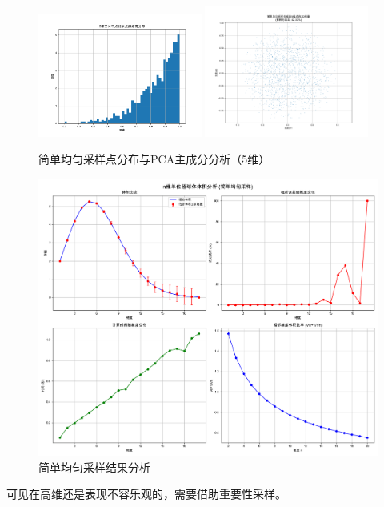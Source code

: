 \begin{figure}[H]
    \centering
    \includegraphics[width=0.48\textwidth]{Problem_1/figs/simple_5d_dis.png}
    \includegraphics[width=0.48\textwidth]{Problem_1/figs/simple_5d_pca.png}
    \caption{简单均匀采样点分布与PCA主成分分析（5维）}
\end{figure}

\begin{figure}[H]
    \centering
    \includegraphics[width=1.0\textwidth]{Problem_1/figs/simple.png}
    \caption{简单均匀采样结果分析}
\end{figure}
可见在高维还是表现不容乐观的，需要借助重要性采样。

